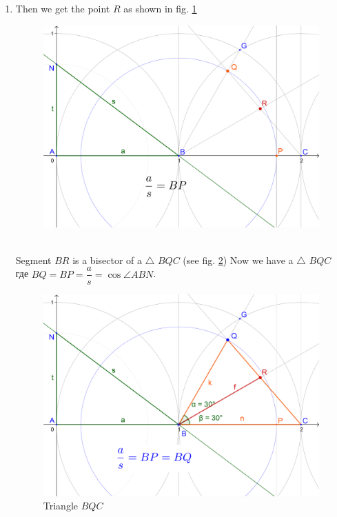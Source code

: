 \documentclass[12pt, letterpaper, oneside]{report}
\begin{document}
\begin{enumerate}
\begin{figure}[h]
\end{figure}
	\item Then we get the point $R$ as shown in fig. \ref{fig:anbopqr}\\
\begin{figure}[h]
	\centerline{\includegraphics[scale=0.14]{img/anbopqR.png}}
	\caption{}
	\label{fig:anbopqr}
\end{figure}\\
	Segment $BR$ is a bisector of a $\triangle$ $BQC$  (see fig. \ref{fig:bqc})
\newpage
Now we have a $\triangle$ $BQC$ где $BQ=BP=\dfrac{a}{s}=\cos \angle ABN$.
\begin{figure}[H]
		\centerline{\includegraphics[scale=0.15]{img/BQC.png}}
		\caption{Triangle $BQC$}
		\label{fig:bqc}
\end{figure}

\end{enumerate}
\end{document}
